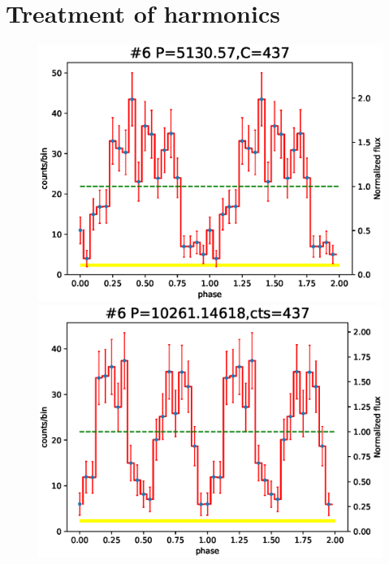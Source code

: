 \documentclass[fleqn,usenatbib]{mnras}
\begin{document}
\section{Treatment of harmonics}\label{harmonics}

\begin{figure}
\begin{minipage}[b]{0.45\textwidth}
\includegraphics[width=\textwidth]{./figure/LW/pfold_lc_20.eps}
\includegraphics[width=\textwidth]{./figure/LW/pfold_lc_20_second.eps}
\end{minipage}
\begin{minipage}[b]{0.45\textwidth}

\end{minipage}
\end{figure}
\end{document}
